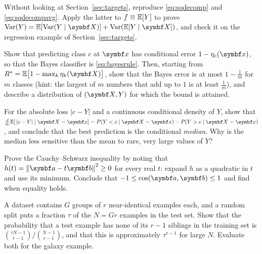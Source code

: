 \documentclass[11pt]{article}
\begin{document}
\begin{questions}
\begin{derivations}
\item Without looking at Section~\ref{sec:targets}, reproduce \eqref{eq:sqdecomp} and \eqref{eq:sqdecompavg}. Apply
the latter to $f \equiv \mathbb{E}[Y]$ to prove $\Var(Y) = \E[\Var(Y \mid \X)] + \Var(\E[Y \mid \X])$, and check it on the
regression example of Section~\ref{sec:targets}.
\item Show that predicting class $c$ at $\x$ has conditional error $1 - \eta_c(\x)$, so that the Bayes classifier
is \eqref{eq:bayesrule}. Then, starting from $R^* = \E\big[1 - \max_k \eta_k(\X)\big]$, show that the Bayes
error is at most $1 - \tfrac1m$ for $m$ classes (hint: the largest of $m$ numbers that add up to $1$ is at least
$\tfrac1m$), and describe a distribution of $(\X, Y)$ for which the bound is attained.
\item For the absolute loss $|c - Y|$ and a continuous conditional density of $Y$, show that
$\frac{d}{dc}\E[\,|c - Y| \mid \X = \x] = P(Y < c \mid \X = \x) - P(Y > c \mid \X = \x)$, and conclude that the best
prediction is the conditional \emph{median}. Why is the median less sensitive than the mean to rare, very large
values of $Y$?
\item Prove the Cauchy--Schwarz inequality by noting that $h(t) = \norm{\vect{a} - t\vect{b}}^2 \ge 0$ for every real
$t$: expand $h$ as a quadratic in $t$ and use its minimum. Conclude that $-1 \le \cos(\vect{a}, \vect{b}) \le 1$ and
find when equality holds.
\item A dataset contains $G$ groups of $r$ near-identical examples each, and a random split puts a fraction $\tau$ of
the $N = Gr$ examples in the test set. Show that the probability that a test example has none of its $r - 1$ siblings
in the training set is $\binom{\tau N - 1}{r - 1} / \binom{N - 1}{r - 1}$, and that this is approximately
$\tau^{r - 1}$ for large $N$. Evaluate both for the galaxy example.
\end{derivations}


\end{questions}
\end{document}
